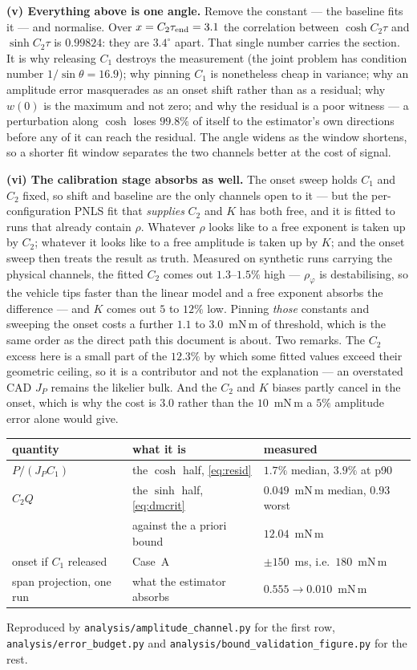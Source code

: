 \documentclass[11pt]{article}
\newcommand{\te}{\tau_{\rm end}}
\begin{document}
\textbf{(v) Everything above is one angle.} Remove the constant --- the
baseline fits it --- and normalise. Over $x = C_2\te = 3.1$ the
correlation between $\cosh C_2\tau$ and $\sinh C_2\tau$ is $0.99824$:
they are $3.4^\circ$ apart. That single number carries the section.
It is why releasing $C_1$ destroys the measurement (the joint problem
has condition number $1/\sin\theta = 16.9$); why pinning $C_1$ is
nonetheless cheap in variance; why an amplitude error masquerades as an
onset shift rather than as a residual; why $w(0)$ is the maximum and not
zero; and why the residual is a poor witness --- a perturbation along
$\cosh$ loses $99.8\%$ of itself to the estimator's own directions
before any of it can reach the residual. The angle widens as the window
shortens, so a shorter fit window separates the two channels better at
the cost of signal.

\textbf{(vi) The calibration stage absorbs as well.} The onset sweep
holds $C_1$ and $C_2$ fixed, so shift and baseline are the only channels
open to it --- but the per-configuration PNLS fit that \emph{supplies}
$C_2$ and $K$ has both free, and it is fitted to runs that already
contain $\rho$. Whatever $\rho$ looks like to a free exponent is taken
up by $C_2$; whatever it looks like to a free amplitude is taken up by
$K$; and the onset sweep then treats the result as truth. Measured on
synthetic runs carrying the physical channels, the fitted $C_2$ comes
out $1.3$--$1.5\%$ high --- $\rho_\varphi$ is destabilising, so the
vehicle tips faster than the linear model and a free exponent absorbs
the difference --- and $K$ comes out $5$ to $12\%$ low. Pinning
\emph{those} constants and sweeping the onset costs a further $1.1$ to
$3.0$~mN\,m of threshold, which is the same order as the direct path
this document is about. Two remarks. The $C_2$ excess here is a small
part of the $12.3\%$ by which some fitted values exceed their geometric
ceiling, so it is a contributor and not the explanation --- an
overstated CAD $J_P$ remains the likelier bulk. And the $C_2$ and $K$
biases partly cancel in the onset, which is why the cost is $3.0$ rather
than the $10$~mN\,m a $5\%$ amplitude error alone would give.

\begin{center}\small
\begin{tabular}{@{}lll@{}}
\toprule
quantity & what it is & measured \\
\midrule
$P/(J_PC_1)$ & the $\cosh$ half, \eqref{eq:resid}
  & $1.7\%$ median, $3.9\%$ at p90 \\
$C_2Q$ & the $\sinh$ half, \eqref{eq:dmcrit}
  & $0.049$~mN\,m median, $0.93$ worst \\
 & against the a priori bound & $12.04$~mN\,m \\
onset if $C_1$ released & Case~A
  & $\pm150$~ms, i.e.\ $180$~mN\,m \\
span projection, one run & what the estimator absorbs
  & $0.555 \to 0.010$~mN\,m \\
\bottomrule
\end{tabular}
\end{center}

Reproduced by \texttt{analysis/amplitude\_channel.py} for the first row,
\texttt{analysis/error\_budget.py} and
\texttt{analysis/bound\_validation\_figure.py} for the rest.
\end{document}
